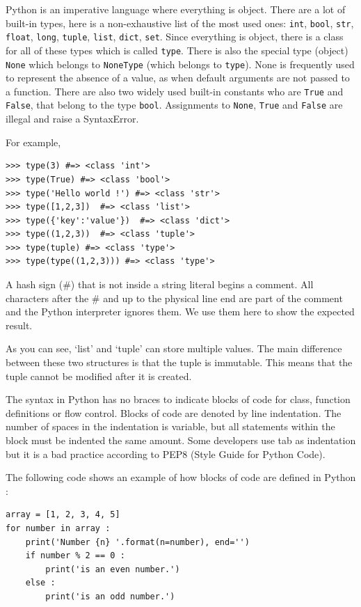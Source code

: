 \documentclass[a4paper,10pt]{article}
\begin{document}
Python is an imperative language where everything is object. 
There are a lot of built-in types, here is a non-exhaustive list of the most used ones: \lstinline{int}, \lstinline{bool}, \lstinline{str}, \lstinline{float}, \lstinline{long}, \lstinline{tuple}, \lstinline{list}, \lstinline{dict}, \lstinline{set}. 
Since everything is object, there is a class for all of these types which is called \lstinline{type}.
There is also the special type (object) \lstinline{None} which belongs to \lstinline{NoneType} (which belongs to \lstinline{type}). 
None is frequently used to represent the absence of a value, as when default arguments are not passed to a function. 
There are also two widely used built-in constants who are \lstinline{True} and \lstinline{False}, that belong to the type \lstinline{bool}. Assignments to \lstinline{None}, \lstinline{True} and \lstinline{False} are illegal and raise a SyntaxError.

For example,
\begin{lstlisting}
>>> type(3) #=> <class 'int'>
>>> type(True) #=> <class 'bool'>
>>> type('Hello world !') #=> <class 'str'>
>>> type([1,2,3])  #=> <class 'list'>
>>> type({'key':'value'})  #=> <class 'dict'>
>>> type((1,2,3))  #=> <class 'tuple'>
>>> type(tuple) #=> <class 'type'>
>>> type(type((1,2,3))) #=> <class 'type'>
\end{lstlisting}

A hash sign (\#) that is not inside a string literal begins a comment. All characters after the \# and up to the physical line end are part of the comment and the Python interpreter ignores them. We use them here to show the expected result.

As you can see, ‘list’ and ‘tuple’ can store multiple values. The main difference between these two structures is that the tuple is immutable. This means that the tuple cannot be modified after it is created.

The syntax in Python has no braces to indicate blocks of code for class, function definitions or flow control. Blocks of code are denoted by line indentation. The number of spaces in the indentation is variable, but all statements within the block must be indented the same amount. Some developers use tab as indentation but it is a bad practice according to PEP8 (Style Guide for Python Code).

The following code shows an example of how blocks of code are defined in Python :

\begin{lstlisting}
array = [1, 2, 3, 4, 5]
for number in array :
    print('Number {n} '.format(n=number), end='')
    if number % 2 == 0 :
        print('is an even number.')
    else :
        print('is an odd number.')
\end{lstlisting}
\end{document}
